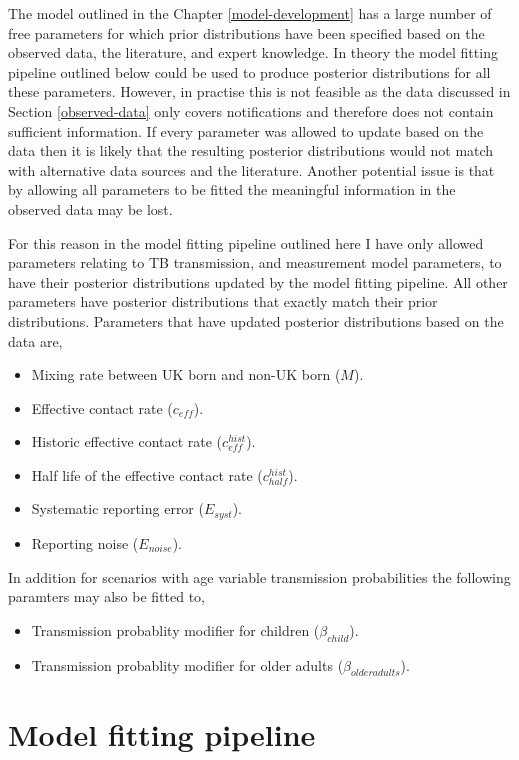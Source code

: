 \documentclass[11pt,twoside]{bristolthesis}
\providecommand{\tightlist}{%
  \setlength{\itemsep}{0pt}\setlength{\parskip}{0pt}}
\begin{document}
  The model outlined in the Chapter \ref{model-development} has a large number of free parameters for which prior distributions have been specified based on the observed data, the literature, and expert knowledge. In theory the model fitting pipeline outlined below could be used to produce posterior distributions for all these parameters. However, in practise this is not feasible as the data discussed in Section \ref{observed-data} only covers notifications and therefore does not contain sufficient information. If every parameter was allowed to update based on the data then it is likely that the resulting posterior distributions would not match with alternative data sources and the literature. Another potential issue is that by allowing all parameters to be fitted the meaningful information in the observed data may be lost.
  
  For this reason in the model fitting pipeline outlined here I have only allowed parameters relating to TB transmission, and measurement model parameters, to have their posterior distributions updated by the model fitting pipeline. All other parameters have posterior distributions that exactly match their prior distributions. Parameters that have updated posterior distributions based on the data are,
  \begin{itemize}
  \tightlist
  \item
    Mixing rate between UK born and non-UK born (\(M\)).
  \item
    Effective contact rate (\(c_{eff}\)).
  \item
    Historic effective contact rate (\(c^{hist}_{eff}\)).
  \item
    Half life of the effective contact rate (\(c^{hist}_{half}\)).
  \item
    Systematic reporting error (\(E_{syst}\)).
  \item
    Reporting noise (\(E_{noise}\)).
  \end{itemize}
  In addition for scenarios with age variable transmission probabilities the following paramters may also be fitted to,
  \begin{itemize}
  \tightlist
  \item
    Transmission probablity modifier for children (\(\beta_{child}\)).
  \item
    Transmission probablity modifier for older adults (\(\beta_{older adults}\)).
  \end{itemize}
  \hypertarget{fitting-pipeline}{%
  \section{Model fitting pipeline}\label{fitting-pipeline}}
  
\end{document}
